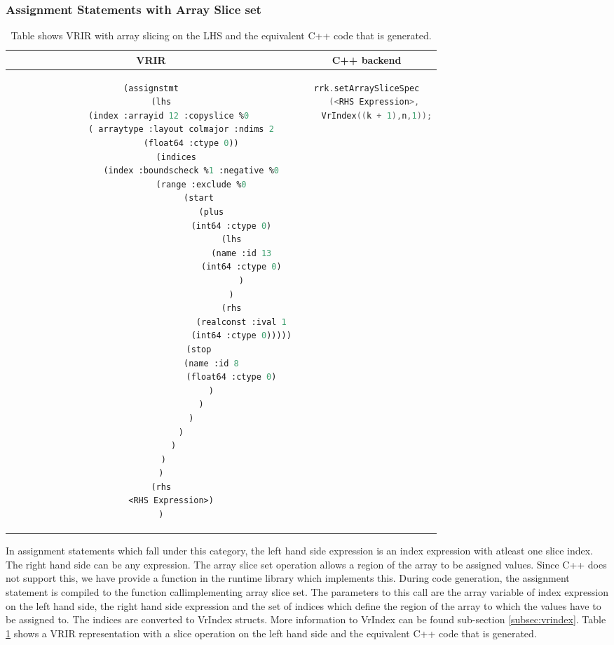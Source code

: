 \subsubsection{Assignment Statements with Array Slice set}
\begin{table}[htbp]
\begin{tabular}{|c|c|}
\hline
VRIR & C++ backend \\
\hline
{
\begin{lstlisting}[language=lisp, frame=none, numbers=none]
(assignstmt
	(lhs
		(index :arrayid 12 :copyslice %0 
			( arraytype :layout colmajor :ndims 2
			 	(float64 :ctype 0))
		  (indices
				(index :boundscheck %1 :negative %0
			 		(range :exclude %0
			  		(start 
			   			(plus
								(int64 :ctype 0)
								(lhs
				 					(name :id 13
				  					(int64 :ctype 0)
									)
								)
								(rhs
				 					(realconst :ival 1
				  					(int64 :ctype 0)))))
			  		(stop 
			   			(name :id 8
								(float64 :ctype 0)
			   			)
			  		)
			 	)
			)
		 )
	 )
	)
	(rhs
		<RHS Expression>)
	)
\end{lstlisting}
} & 
{
\begin{lstlisting}[language=c,frame=none, numbers=none]
rrk.setArraySliceSpec
	(<RHS Expression>, 
	VrIndex((k + 1),n,1));
		\end{lstlisting}
} \\
\hline
\end{tabular}
\caption[Assignment with array slice set]{Table shows VRIR with array slicing on the LHS and the equivalent C++ code that is generated.}
\label{tab:sliceAssign}
\end{table}
In assignment statements which fall under this category, the left hand side expression is an index expression with atleast one slice index. The right hand side can be any expression. The array slice set operation allows a region of the array to be assigned values. Since C++ does not support this, we have provide a function in the runtime library which implements this. During code generation, the assignment statement is compiled to the function callimplementing array slice set. The parameters to this call are the array variable of index expression on the left hand side, the right hand side expression and the set of indices which define the region of the array to which the values have to be assigned to. The indices are converted to VrIndex structs. More information to VrIndex can be found sub-section \ref{subsec:vrindex}. Table \ref{tab:sliceAssign} shows a VRIR representation with a slice operation on the left hand side and the equivalent C++ code that is generated.
